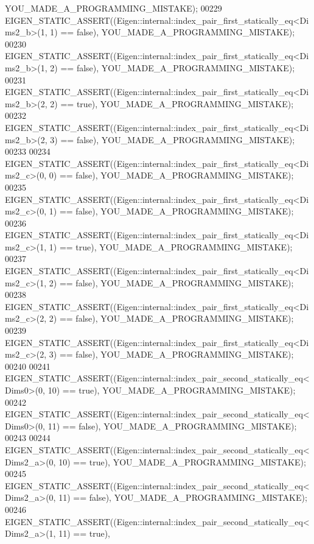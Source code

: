\begin{DoxyCode}
      YOU\_MADE\_A\_PROGRAMMING\_MISTAKE);
00229   EIGEN\_STATIC\_ASSERT((Eigen::internal::index\_pair\_first\_statically\_eq<Dims2\_b>(1, 1) == \textcolor{keyword}{false}), 
      YOU\_MADE\_A\_PROGRAMMING\_MISTAKE);
00230   EIGEN\_STATIC\_ASSERT((Eigen::internal::index\_pair\_first\_statically\_eq<Dims2\_b>(1, 2) == \textcolor{keyword}{false}), 
      YOU\_MADE\_A\_PROGRAMMING\_MISTAKE);
00231   EIGEN\_STATIC\_ASSERT((Eigen::internal::index\_pair\_first\_statically\_eq<Dims2\_b>(2, 2) == \textcolor{keyword}{true}), 
      YOU\_MADE\_A\_PROGRAMMING\_MISTAKE);
00232   EIGEN\_STATIC\_ASSERT((Eigen::internal::index\_pair\_first\_statically\_eq<Dims2\_b>(2, 3) == \textcolor{keyword}{false}), 
      YOU\_MADE\_A\_PROGRAMMING\_MISTAKE);
00233 
00234   EIGEN\_STATIC\_ASSERT((Eigen::internal::index\_pair\_first\_statically\_eq<Dims2\_c>(0, 0) == \textcolor{keyword}{false}), 
      YOU\_MADE\_A\_PROGRAMMING\_MISTAKE);
00235   EIGEN\_STATIC\_ASSERT((Eigen::internal::index\_pair\_first\_statically\_eq<Dims2\_c>(0, 1) == \textcolor{keyword}{false}), 
      YOU\_MADE\_A\_PROGRAMMING\_MISTAKE);
00236   EIGEN\_STATIC\_ASSERT((Eigen::internal::index\_pair\_first\_statically\_eq<Dims2\_c>(1, 1) == \textcolor{keyword}{true}), 
      YOU\_MADE\_A\_PROGRAMMING\_MISTAKE);
00237   EIGEN\_STATIC\_ASSERT((Eigen::internal::index\_pair\_first\_statically\_eq<Dims2\_c>(1, 2) == \textcolor{keyword}{false}), 
      YOU\_MADE\_A\_PROGRAMMING\_MISTAKE);
00238   EIGEN\_STATIC\_ASSERT((Eigen::internal::index\_pair\_first\_statically\_eq<Dims2\_c>(2, 2) == \textcolor{keyword}{false}), 
      YOU\_MADE\_A\_PROGRAMMING\_MISTAKE);
00239   EIGEN\_STATIC\_ASSERT((Eigen::internal::index\_pair\_first\_statically\_eq<Dims2\_c>(2, 3) == \textcolor{keyword}{false}), 
      YOU\_MADE\_A\_PROGRAMMING\_MISTAKE);
00240 
00241   EIGEN\_STATIC\_ASSERT((Eigen::internal::index\_pair\_second\_statically\_eq<Dims0>(0, 10) == \textcolor{keyword}{true}), 
      YOU\_MADE\_A\_PROGRAMMING\_MISTAKE);
00242   EIGEN\_STATIC\_ASSERT((Eigen::internal::index\_pair\_second\_statically\_eq<Dims0>(0, 11) == \textcolor{keyword}{false}), 
      YOU\_MADE\_A\_PROGRAMMING\_MISTAKE);
00243 
00244   EIGEN\_STATIC\_ASSERT((Eigen::internal::index\_pair\_second\_statically\_eq<Dims2\_a>(0, 10) == \textcolor{keyword}{true}), 
      YOU\_MADE\_A\_PROGRAMMING\_MISTAKE);
00245   EIGEN\_STATIC\_ASSERT((Eigen::internal::index\_pair\_second\_statically\_eq<Dims2\_a>(0, 11) == \textcolor{keyword}{false}), 
      YOU\_MADE\_A\_PROGRAMMING\_MISTAKE);
00246   EIGEN\_STATIC\_ASSERT((Eigen::internal::index\_pair\_second\_statically\_eq<Dims2\_a>(1, 11) == \textcolor{keyword}{true}), 

\end{DoxyCode}
